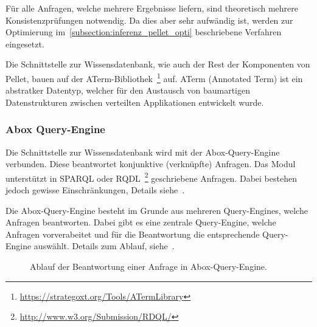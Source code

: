 Für alle Anfragen, welche mehrere Ergebnisse liefern, sind theoretisch mehrere Konsistenzprüfungen notwendig. Da dies aber sehr aufwändig ist, werden zur Optimierung im~\autoref{subsection:inferenz_pellet_opti} beschriebene Verfahren eingesetzt.

Die Schnittstelle zur Wissensdatenbank, wie auch der Rest der Komponenten von Pellet, bauen auf der ATerm-Bibliothek~\footnote{\url{https://strategoxt.org/Tools/ATermLibrary}} auf. ATerm (Annotated Term) ist ein abstratker Datentyp, welcher für den Austausch von baumartigen Datenstrukturen zwischen verteilten Applikationen entwickelt wurde.

\subsubsection{Abox Query-Engine}
\label{ssubsection:inferenz_pellet_aboxquery}
Die Schnittstelle zur Wissensdatenbank wird mit der Abox-Query-Engine verbunden. Diese beantwortet konjunktive (verknüpfte) Anfragen. Das Modul unterstützt in SPARQL oder RQDL~\footnote{\url{http://www.w3.org/Submission/RDQL/}} geschriebene Anfragen. Dabei bestehen jedoch gewisse Einschränkungen, Details siehe~\cite[S. 10 - 11]{sirin:pellet05}.

Die Abox-Query-Engine besteht im Grunde aus mehreren Query-Engines, welche Anfragen beantworten. Dabei gibt es eine zentrale Query-Engine, welche Anfragen vorverabeitet und für die Beantwortung die entsprechende Query-Engine auswählt. Details zum Ablauf, siehe~\cite[S. 11]{sirin:pellet05}.

\begin{figure}[htbp]
    \centering {}
    \caption{Ablauf der Beantwortung einer Anfrage in Abox-Query-Engine.\label{fig:pellet_queryengine_komponenten}\protect\footnotemark}
\end{figure}


